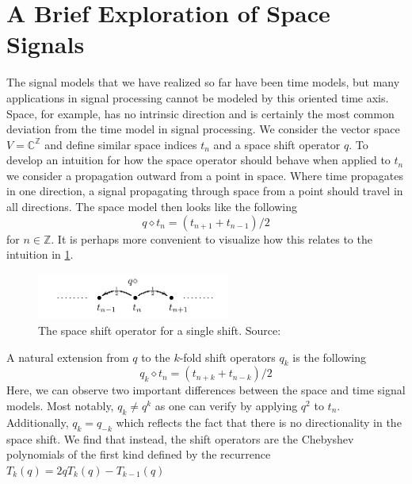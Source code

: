 \documentclass[12pt,technote]{IEEEtran}
\begin{document}
\section{A Brief Exploration of Space Signals}
The signal models that we have realized so far have been time models, but many applications in signal processing cannot be modeled by this oriented time axis. Space, for example, has no intrinsic direction and is certainly the most common deviation from the time model in signal processing. We consider the vector space $V = \mathbb{C}^\mathbb{Z}$ and define similar space indices $t_n$ and a space shift operator $q$. To develop an intuition for how the space operator should behave when applied to $t_n$ we consider a propagation outward from a point in space. Where time propagates in one direction, a signal propagating through space from a point should travel in all directions. The space model then looks like the following
\begin{equation*}
    q\diamond t_n = (t_{n+1} + t_{n-1})/2
\end{equation*}
for $n\in \mathbb{Z}$. It is perhaps more convenient to visualize how this relates to the intuition in \ref{fig:space}.
\begin{figure}[h]
    \begin{center}
        \includegraphics[width=2.5in]{figures/space_shift.png}
        \caption{The space shift operator for a single shift. Source: \cite{AlgebraicSignalProcessing2006}}
        \label{fig:space}
    \end{center}
\end{figure}
A natural extension from $q$ to the $k$-fold shift operators $q_k$ is the following
\begin{equation*}
    q_k\diamond t_n = (t_{n+k} + t_{n-k})/2
\end{equation*}
Here, we can observe two important differences between the space and time signal models. Most notably, $q_k \neq q^k$ as one can verify by applying $q^2$ to $t_n$. Additionally, $q_k = q_{-k}$ which reflects the fact that there is no directionality in the space shift. We find that instead, the shift operators are the Chebyshev polynomials of the first kind defined by the recurrence $T_k(q) = 2qT_k(q) - T_{k-1}(q)$
\end{document}
